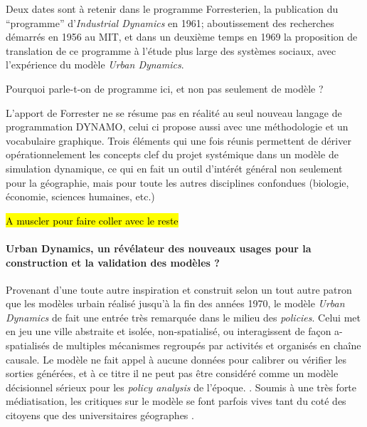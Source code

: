 Deux dates sont à retenir dans le programme Forresterien, la publication du \enquote{programme} d'\textit{Industrial Dynamics} en 1961; aboutissement des recherches démarrés en 1956 au MIT, et dans un deuxième temps en 1969 la proposition de translation de ce programme à l'étude plus large des systèmes sociaux, avec l'expérience du modèle \textit{Urban Dynamics}.

Pourquoi parle-t-on de programme ici, et non pas seulement de modèle ?

L'apport de Forrester ne se résume pas en réalité au seul nouveau langage de programmation DYNAMO, celui ci propose aussi avec une méthodologie et un vocabulaire graphique. Trois éléments qui une fois réunis permettent de dériver opérationnelement les concepts clef du projet systémique dans un modèle de simulation dynamique, ce qui en fait un outil d'intérét général non seulement pour la géographie, mais pour toute les autres disciplines confondues (biologie, économie, sciences humaines, etc.) \autocite{Rosnay1975}

\hl{A muscler pour faire coller avec le reste}

\paragraph{Urban Dynamics, un révélateur des nouveaux usages pour la construction et la validation des modèles ?}
\label{p:urbanDyn_revelateur}

Provenant d'une toute autre inspiration et construit selon un tout autre patron que les modèles urbain réalisé jusqu'à la fin des années 1970, le modèle \textit{Urban Dynamics} de \textcite{Forrester1969} fait une entrée très remarquée dans le milieu des \textit{policies}. Celui met en jeu une ville abstraite et isolée, non-spatialisé, ou interagissent de façon a-spatialisés de multiples mécanismes regroupés par activités et organisés en chaîne causale. Le modèle ne fait appel à aucune données pour calibrer ou vérifier les sorties générées, et à ce titre il ne peut pas être considéré comme un modèle décisionnel sérieux pour les \textit{policy analysis} de l'époque. \autocite{Lee1973}. Soumis à une très forte médiatisation, les critiques sur le modèle se font parfois vives tant du coté des citoyens \autocite{Forrester1989, Forrester2007} que des universitaires géographes \autocite{Tobler1970a, Berry1970b, Batty1971}.

